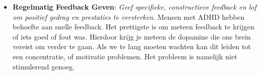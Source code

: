 \begin{itemize}
                    \item \textbf{Regelmatig Feedback Geven}: 
                        \textit{Geef specifieke, constructieve feedback en lof om positief gedrag en prestaties te versterken}. Mensen met ADHD hebben behoefte aan snelle feedback. Het prettigste is om meteen feedback te krijgen of iets goed of fout was. Hierdoor krijg je meteen de dopamine die ons brein vereist om verder te gaan. Als we te lang moeten wachten kan dit leiden tot een concentratie, of motivatie problemen. Het probleem is namelijk niet stimulerend genoeg.
                    
                \end{itemize}

            